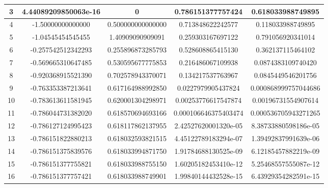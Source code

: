 \begin{table}[H]
\begin{table}[H]
\begin{table}[H]
\begin{table}[H]
\begin{table}[htbp]
\begin{subtable}[t]{\textwidth}
\begin{tabular}{|c|c|c|c|c|}
		3	&	\footnotesize	4.44089209850063e-16	&	\footnotesize	0					&	\footnotesize	0.786151377757424		&	\footnotesize	0.618033988749895		\\	\hline
		4	&	\footnotesize	-1.50000000000000		&	\footnotesize	0.500000000000000	&	\footnotesize	0.713848622242577		&	\footnotesize	0.118033988749895		\\	\hline
		5	&	\footnotesize	-1.04545454545455		&	\footnotesize	1.40909090909091	&	\footnotesize	0.259303167697122		&	\footnotesize	0.791056920341014		\\	\hline
		6	&	\footnotesize	-0.257542512342293		&	\footnotesize	0.255896873285793	&	\footnotesize	0.528608865415130		&	\footnotesize	0.362137115464102		\\	\hline
		7	&	\footnotesize	-0.569665310647485		&	\footnotesize	0.530595677775853	&	\footnotesize	0.216486067109938		&	\footnotesize	0.0874383109740420		\\	\hline
		8	&	\footnotesize	-0.920368915521390		&	\footnotesize	0.702578943370071	&	\footnotesize	0.134217537763967		&	\footnotesize	0.0845449546201756		\\	\hline
		9	&	\footnotesize	-0.763353387213641		&	\footnotesize	0.617164988992850	&	\footnotesize	0.0227979905437824		&	\footnotesize	0.000868999757044686	\\	\hline
		10	&	\footnotesize	-0.783613611581945		&	\footnotesize	0.620001304298971	&	\footnotesize	0.00253776617547874		&	\footnotesize	0.00196731554907614		\\	\hline
		11	&	\footnotesize	-0.786044731382020		&	\footnotesize	0.618570694693166	&	\footnotesize	0.000106646375403474	&	\footnotesize	0.000536705943271265	\\	\hline
		12	&	\footnotesize	-0.786127124995423		&	\footnotesize	0.618117862137955	&	\footnotesize	2.42527620001320e-05	&	\footnotesize	8.38733880598186e-05	\\	\hline
		13	&	\footnotesize	-0.786151822880213		&	\footnotesize	0.618032593821515	&	\footnotesize	4.45122789183294e-07	&	\footnotesize	1.39492837991639e-06	\\	\hline
		14	&	\footnotesize	-0.786151375839576		&	\footnotesize	0.618033994871750	&	\footnotesize	1.91784688130525e-09	&	\footnotesize	6.12185457882219e-09	\\	\hline
		15	&	\footnotesize	-0.786151377755821		&	\footnotesize	0.618033988755150	&	\footnotesize	1.60205182453410e-12	&	\footnotesize	5.25468557555087e-12	\\	\hline
		16	&	\footnotesize	-0.786151377757421		&	\footnotesize	0.618033988749901	&	\footnotesize	1.99840144432528e-15	&	\footnotesize	6.43929354282591e-15	\\	\hline

\end{tabular}
\end{subtable}
\end{table}
\end{table}
\end{table}
\end{table}
\end{table}
